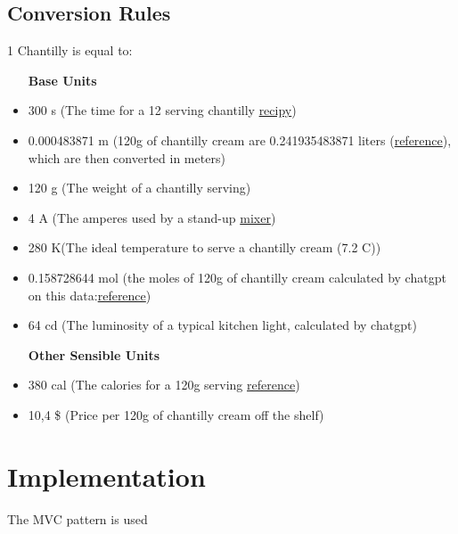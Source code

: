 \documentclass[12pt, a4paper]{report}
\begin{document}
\section{Conversion Rules}
1 Chantilly is equal to:
\begin{itemize}
    \item [\textbf{Base Units}]
    \item 300 s (The time for a 12 serving chantilly \href{https://www.thespruceeats.com/vanilla-chantilly-cream-recipe-1375640}{recipy})
    \item 0.000483871 m (120g of chantilly cream are 0.241935483871 liters (\href{https://www.inchcalculator.com/convert/gram-to-liter/}{reference}), which are then converted in meters)
    \item 120 g (The weight of a chantilly serving)
    \item 4 A (The amperes used by a stand-up \href{https://anationofmoms.com/2023/04/stand-up-mixer-amps.html}{mixer})
    \item 280 K\textdegree (The ideal temperature to serve a chantilly cream (7.2 C\textdegree))
    \item 0.158728644 mol (the moles of 120g of chantilly cream calculated by chatgpt on this data:\href{https://www.fatsecret.com/calories-nutrition/generic/chantilly-cream?portionid=49910&portionamount=100.000&frc=True}{reference})
    \item 64 cd (The luminosity of a typical kitchen light, calculated by chatgpt)
\end{itemize}
\begin{itemize}
    \item [\textbf{Other Sensible Units}]
    \item 380 cal (The calories for a 120g serving \href{https://www.fatsecret.com/calories-nutrition/generic/chantilly-cream?portionid=49910&portionamount=100.000&frc=True}{reference})
    \item 10,4 \$ (Price per 120g of chantilly cream off the shelf)
\end{itemize}

\chapter{Implementation}
The MVC pattern is used



\end{document}
